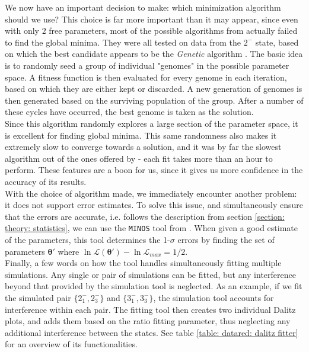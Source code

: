 We now have an important decision to make: which minimization algorithm should we use? This choice is far more important than it may appear, since even with only $2$ free parameters, most of the possible algorithms from \ROOT{} actually failed to find the global minima. They were all tested on data from the $2^-$ state, based on which the best candidate appears to be the \textit{Genetic} algorithm \cite{genetic}. The basic idea is to randomly seed a group of individual "genomes" in the possible parameter space. A fitness function is then evaluated for every genome in each iteration, based on which they are either kept or discarded. A new generation of genomes is then generated based on the surviving population of the group. After a number of these cycles have occurred, the best genome is taken as the solution. \\

Since this algorithm randomly explores a large section of the parameter space, it is excellent for finding global minima. This same randomness also makes it extremely slow to converge towards a solution, and it was by far the slowest algorithm out of the ones offered by \ROOT{} - each fit takes more than an hour to perform. These features are a boon for us, since it gives us more confidence in the accuracy of its results. \\

With the choice of algorithm made, we immediately encounter another problem: it does not support error estimates. To solve this issue, and simultaneously ensure that the errors are accurate, i.e. follows the description from section \ref{section: theory: statistics}, we can use the \texttt{MINOS} tool from \ROOT{} \cite{minos}. When given a good estimate of the parameters, this tool determines the 1-$\sigma$ errors by finding the set of parameters $\bm{\theta}'$ where $\ln \mathcal{L}(\bm{\theta}') - \ln \mathcal{L}_{max} = 1/2$. \\

Finally, a few words on how the tool handles simultaneously fitting multiple simulations. Any single or pair of \simta{} simulations can be fitted, but any interference beyond that provided by the simulation tool is neglected. As an example, if we fit the simulated pair $\{2^-_1, 2^-_3\}$ and $\{3^-_1, 3^-_3\}$, the simulation tool accounts for interference within each pair. The fitting tool then creates two individual Dalitz plots, and adds them based on the ratio fitting parameter, thus neglecting any additional interference between the states. See table \ref{table: datared: dalitz fitter} for an overview of its functionalities. 

